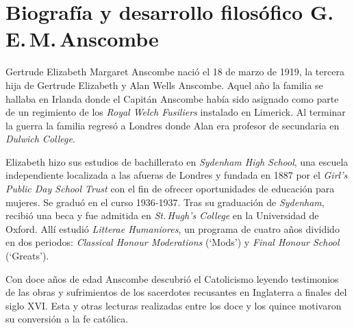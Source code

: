 \section{Biografía y desarrollo filosófico G.\,E.\,M.\,Anscombe}

Gertrude Elizabeth Margaret Anscombe nació el 18 de marzo de 1919, la tercera hija de Gertrude Elizabeth y Alan Wells Anscombe. Aquel año la familia se hallaba en Irlanda donde el Capitán Anscombe había sido asignado como parte de un regimiento de los \emph{Royal Welch Fusiliers} instalado en Limerick. Al terminar la guerra la familia regresó a Londres donde Alan era profesor de secundaria en \emph{Dulwich College}\autocite[Cf.~][31]{teichman2002fellows}.

Elizabeth hizo sus estudios de bachillerato en \emph{Sydenham High School}, una escuela independiente localizada a las afueras de Londres y fundada en 1887 por el \emph{Girl's Public Day School Trust} con el fin de ofrecer oportunidades de educación para mujeres. Se graduó en el curso 1936-1937. Tras su graduación de \emph{Sydenham}, recibió una beca y fue admitida en \emph{St.\,Hugh's College} en la Universidad de Oxford. Allí estudió \emph{Litterae Humaniores}, un programa de cuatro años dividido en dos periodos: \emph{Classical Honour Moderations} (`Mods') y \emph{Final Honour School} (`Greats').

Con doce años de edad Anscombe descubrió el Catolicismo leyendo testimonios de las obras y sufrimientos de los sacerdotes recusantes en Inglaterra a finales del siglo XVI. Esta y otras lecturas realizadas entre los doce y los quince motivaron su conversión a la fe católica\autocite[Cf.~][33]{teichman2002fellows}.

